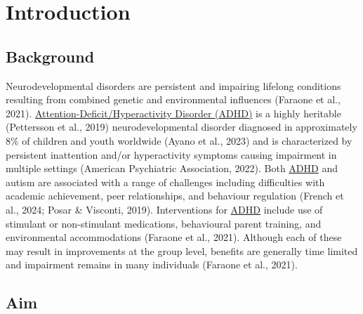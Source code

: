 \documentclass[
  letterpaper,
]{ut-thesis}
\begin{document}

\chapter{Introduction}\label{introduction}


\section{Background}\label{background}

Neurodevelopmental disorders are persistent and impairing lifelong
conditions resulting from combined genetic and environmental influences
(Faraone et al., 2021).
\hyperref[acronyms_ADHD]{Attention-Deficit/Hyperactivity Disorder
(ADHD)} is a highly heritable (Pettersson et al., 2019)
neurodevelopmental disorder diagnosed in approximately 8\% of children
and youth worldwide (Ayano et al., 2023) and is characterized by
persistent inattention and/or hyperactivity symptoms causing impairment
in multiple settings (American Psychiatric Association, 2022). Both
\hyperref[acronyms_ADHD]{ADHD} and autism are associated with a range of
challenges including difficulties with academic achievement, peer
relationships, and behaviour regulation (French et al., 2024; Posar \&
Visconti, 2019). Interventions for \hyperref[acronyms_ADHD]{ADHD}
include use of stimulant or non-stimulant medications, behavioural
parent training, and environmental accommodations (Faraone et al.,
2021). Although each of these may result in improvements at the group
level, benefits are generally time limited and impairment remains in
many individuals (Faraone et al., 2021).

\section{Aim}\label{aim}
\end{document}
